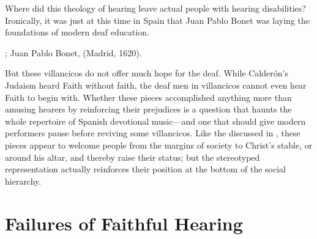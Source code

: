 Where did this theology of hearing leave actual people with hearing
disabilities? 
Ironically, it was just at this time in Spain that Juan Pablo Bonet was laying
the foundations of modern deaf education.%
\begin{Footnote}
    \Autocite{Plann:DeafEducationSpain};
    Juan Pablo Bonet,  (Madrid, 1620).
\end{Footnote}
But these villancicos do not offer much hope for the deaf.
While Calderón's Judaism heard Faith without faith, the deaf men in villancicos
cannot even hear Faith to begin with.
Whether these pieces accomplished anything more than amusing hearers by
reinforcing their prejudices is a question that haunts the whole repertoire of
Spanish devotional music---and one that should give modern performers pause
before reviving some villancicos.%
    \Autocite[7]{Cashner:WLSCM32}
Like the  discussed in , these pieces
appear to welcome people from the margins of society to Christ's stable, or
around his altar, and thereby raise their status; but the stereotyped
representation actually reinforces their position at the bottom of the social
hierarchy.


\section{Failures of Faithful Hearing}

